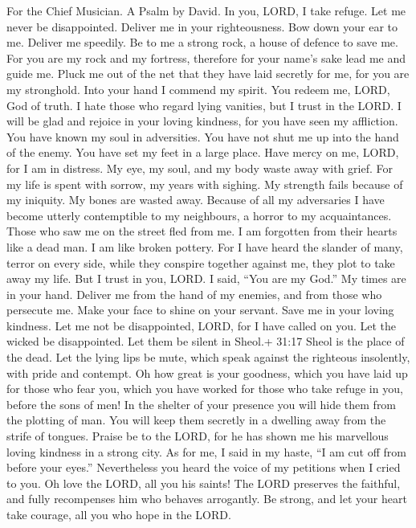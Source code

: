 For the Chief Musician. A Psalm by David.  In you, LORD, I
take refuge. Let me never be disappointed. Deliver me in your
righteousness.  Bow down your ear to me. Deliver me
speedily. Be to me a strong rock, a house of defence to save me.
 For you are my rock and my fortress, therefore for your
name's sake lead me and guide me.  Pluck me out of the net
that they have laid secretly for me, for you are my stronghold.
 Into your hand I commend my spirit. You redeem me, LORD,
God of truth.  I hate those who regard lying vanities, but I
trust in the LORD.  I will be glad and rejoice in your
loving kindness, for you have seen my affliction. You have known my soul
in adversities.  You have not shut me up into the hand of
the enemy. You have set my feet in a large place.  Have
mercy on me, LORD, for I am in distress. My eye, my soul, and my body
waste away with grief.  For my life is spent with sorrow,
my years with sighing. My strength fails because of my iniquity. My
bones are wasted away.  Because of all my adversaries I
have become utterly contemptible to my neighbours, a horror to my
acquaintances. Those who saw me on the street fled from me.
 I am forgotten from their hearts like a dead man. I am
like broken pottery.  For I have heard the slander of many,
terror on every side, while they conspire together against me, they plot
to take away my life.  But I trust in you, LORD. I said,
``You are my God.''  My times are in your hand. Deliver me
from the hand of my enemies, and from those who persecute me.
 Make your face to shine on your servant. Save me in your
loving kindness.  Let me not be disappointed, LORD, for I
have called on you. Let the wicked be disappointed. Let them be silent
in Sheol.+ 31:17 Sheol is the place of the dead.  Let the
lying lips be mute, which speak against the righteous insolently, with
pride and contempt.  Oh how great is your goodness, which
you have laid up for those who fear you, which you have worked for those
who take refuge in you, before the sons of men!  In the
shelter of your presence you will hide them from the plotting of man.
You will keep them secretly in a dwelling away from the strife of
tongues.  Praise be to the LORD, for he has shown me his
marvellous loving kindness in a strong city.  As for me, I
said in my haste, ``I am cut off from before your eyes.'' Nevertheless
you heard the voice of my petitions when I cried to you. 
Oh love the LORD, all you his saints! The LORD preserves the faithful,
and fully recompenses him who behaves arrogantly.  Be
strong, and let your heart take courage, all you who hope in the LORD.

